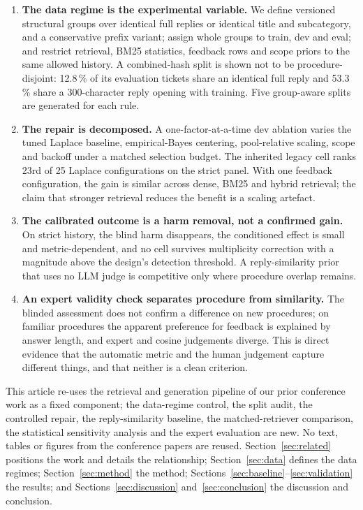 \begin{enumerate}
\item \textbf{The data regime is the experimental variable.} We define versioned
structural groups over identical full replies or identical title and subcategory,
and a conservative prefix variant; assign whole groups to train, dev and eval; and
restrict retrieval, BM25 statistics, feedback rows and scope priors to the same
allowed history. A combined-hash split is shown not to be procedure-disjoint:
12.8\,\% of its evaluation tickets share an identical full reply and 53.3\,\%
share a 300-character reply opening with training. Five
group-aware splits are generated for each rule.
\item \textbf{The repair is decomposed.} A one-factor-at-a-time dev ablation varies
the tuned Laplace baseline, empirical-Bayes centering, pool-relative scaling, scope
and backoff under a matched selection budget. The inherited legacy cell ranks 23rd
of 25 Laplace configurations on the strict panel. With one feedback configuration,
the gain is similar across dense, BM25 and hybrid retrieval; the claim that
stronger retrieval reduces the benefit is a scaling artefact.
\item \textbf{The calibrated outcome is a harm removal, not a confirmed gain.} On
strict history, the blind harm disappears, the conditioned effect is small and
metric-dependent, and no cell survives multiplicity correction with a magnitude
above the design's detection threshold. A reply-similarity prior that uses no LLM
judge is competitive only where procedure overlap remains.
\item \textbf{An expert validity check separates procedure from similarity.} The
blinded assessment does not confirm a difference on new procedures; on familiar procedures
the apparent preference for feedback is explained by answer length, and expert and
cosine judgements diverge. This is direct evidence that the automatic metric and
the human judgement capture different things, and that neither is a clean
criterion.
\end{enumerate}

This article re-uses the retrieval and generation pipeline of our prior
conference work \cite{b31,b32} as a fixed component; the data-regime control, the
split audit, the controlled repair, the reply-similarity baseline, the
matched-retriever comparison, the statistical sensitivity analysis and the expert
evaluation are new. No text, tables or figures from the conference papers are
reused. Section~\ref{sec:related} positions the work and details the relationship;
Section~\ref{sec:data} defines the data regimes; Section~\ref{sec:method} the
method; Sections~\ref{sec:baseline}--\ref{sec:validation} the results; and
Sections~\ref{sec:discussion} and~\ref{sec:conclusion} the discussion and
conclusion.
